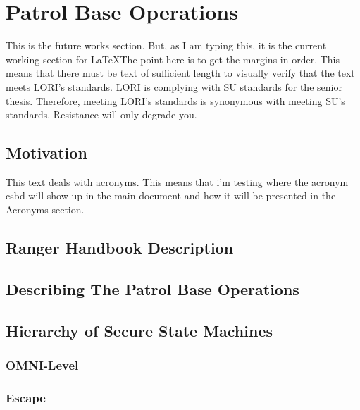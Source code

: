 \documentclass[../../main/main.tex]{subfiles}
\begin{document}
\chapter{Patrol Base Operations}
This is the future works section. But, as I am typing this, it is the current working section for \LaTeX\.  The point here is to get the margins in order.   This means that there must be text of sufficient length to visually verify that the text meets LORI's standards.  LORI is complying with SU standards for the senior thesis.  Therefore, meeting LORI's standards is synonymous with meeting SU's standards.  Resistance will only degrade you.
\section{Motivation}
This text deals with acronyms.  This means that i'm testing where the acronym \Gls{csbd} will show-up in the main document and how it will be presented in the Acronyms section.

\section{Ranger Handbook Description}

\section{Describing The Patrol Base Operations}

\section{Hierarchy of Secure State Machines}

\subsection{OMNI-Level}

\subsection{Escape}
\end{document}
